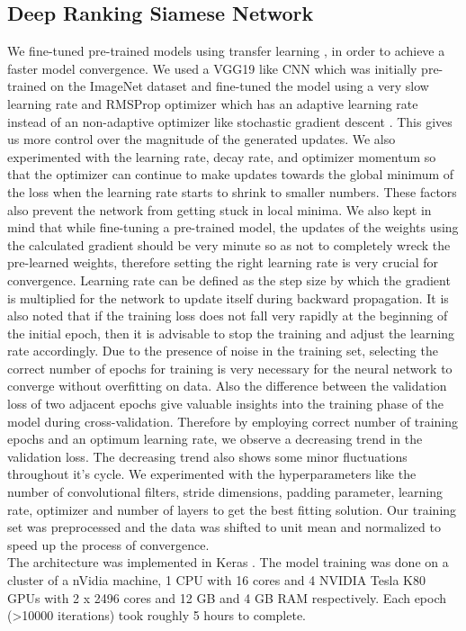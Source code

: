 \documentclass[10pt,twocolumn,letterpaper]{article}
\begin{document}
\subsection{Deep Ranking Siamese Network}
We fine-tuned pre-trained models using transfer learning \cite{c28}, in order to achieve a faster model convergence. We used a VGG19 like CNN which was initially pre-trained on the ImageNet dataset and fine-tuned the model using a very slow learning rate and RMSProp optimizer which has an adaptive learning rate \cite{c29} instead of an non-adaptive optimizer like stochastic gradient descent \cite{c27}. This gives us more control over the magnitude of the generated updates. We also experimented with the learning rate, decay rate, and optimizer momentum so that the optimizer can continue to make updates towards the global minimum of the loss when the learning rate starts to shrink to smaller numbers. These factors also prevent the network from getting stuck in local minima. We also kept in mind that while fine-tuning a pre-trained model, the updates of the weights using the calculated gradient should be very minute so as not to completely wreck the pre-learned weights, therefore setting the right learning rate is very crucial for convergence. Learning rate can be defined as the step size by which the gradient is multiplied for the network to update itself during backward propagation. It is also noted that if the training loss does not fall very rapidly at the beginning of the initial epoch, then it is advisable to stop the training and adjust the learning rate accordingly. Due to the presence of noise in the training set, selecting the correct number of epochs for training is very necessary for the neural network to converge without overfitting on data. Also the difference between the validation loss of two adjacent epochs give valuable insights into the training phase of the model during cross-validation. Therefore by employing correct number of training epochs and an optimum learning rate, we observe a decreasing trend in the validation loss. The decreasing trend also shows some minor fluctuations throughout it's cycle. We experimented with the hyperparameters like the number of convolutional filters, stride dimensions, padding parameter, learning rate, optimizer and number of layers to get the best fitting solution. Our training set was preprocessed and the data was shifted to unit mean and normalized to speed up the process of convergence.\\
The architecture was implemented in Keras \cite{c32}. The model training was done on a cluster of a nVidia machine, 1 CPU with 16 cores and 4 NVIDIA Tesla K80 GPUs with 2 x 2496 cores and 12 GB and 4 GB RAM respectively. Each epoch (\textgreater10000 iterations) took roughly 5 hours to complete.
\vspace{-1mm}
\end{document}
